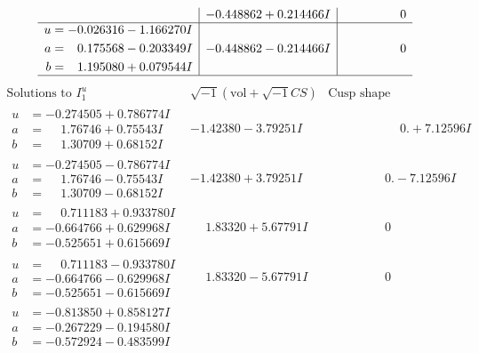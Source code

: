 \documentclass[1p]{elsarticle_modified}
\theoremstyle{definition}
\newcommand{\I}{\sqrt{-1}}
\begin{document}
$$\begin{array}{c|c|c}
 & -0.448862 + 0.214466 I & \phantom{-0.000000 } 0 \\ \hline\begin{aligned}
u &= -0.026316 - 1.166270 I \\
a &= \phantom{-}0.175568 - 0.203349 I \\
b &= \phantom{-}1.195080 + 0.079544 I\end{aligned}
 & -0.448862 - 0.214466 I & \phantom{-0.000000 } 0\\
 \hline 
 \end{array}$$\newpage$$\begin{array}{c|c|c}  
\text{Solutions to }I^u_{1}& \I (\text{vol} + \sqrt{-1}CS) & \text{Cusp shape}\\
 \hline 
\begin{aligned}
u &= -0.274505 + 0.786774 I \\
a &= \phantom{-}1.76746 + 0.75543 I \\
b &= \phantom{-}1.30709 + 0.68152 I\end{aligned}
 & -1.42380 - 3.79251 I & \phantom{-0.000000 -}0. + 7.12596 I \\ \hline\begin{aligned}
u &= -0.274505 - 0.786774 I \\
a &= \phantom{-}1.76746 - 0.75543 I \\
b &= \phantom{-}1.30709 - 0.68152 I\end{aligned}
 & -1.42380 + 3.79251 I & \phantom{-0.000000 } 0. - 7.12596 I \\ \hline\begin{aligned}
u &= \phantom{-}0.711183 + 0.933780 I \\
a &= -0.664766 + 0.629968 I \\
b &= -0.525651 + 0.615669 I\end{aligned}
 & \phantom{-}1.83320 + 5.67791 I & \phantom{-0.000000 } 0 \\ \hline\begin{aligned}
u &= \phantom{-}0.711183 - 0.933780 I \\
a &= -0.664766 - 0.629968 I \\
b &= -0.525651 - 0.615669 I\end{aligned}
 & \phantom{-}1.83320 - 5.67791 I & \phantom{-0.000000 } 0 \\ \hline\begin{aligned}
u &= -0.813850 + 0.858127 I \\
a &= -0.267229 - 0.194580 I \\
b &= -0.572924 - 0.483599 I\end{aligned}

\end{array}$$
\end{document}
